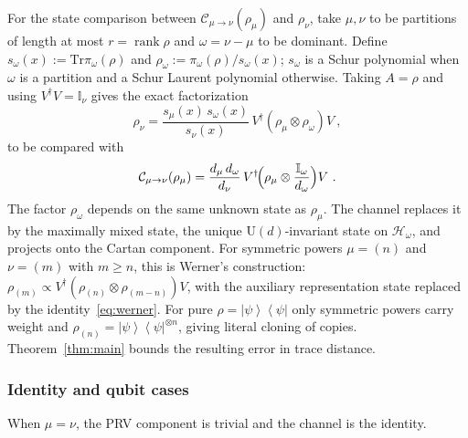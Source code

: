 \documentclass[a4paper,onecolumn,11pt]{quantumarticle}
\newcommand{\ketbra}[2]{\left|#1\right\rangle\!\!\left\langle #2\right|}
\def\h{\mathcal{H}}
\def\id{\mathbb{I}}
\newcommand*{\Tr}{\mathrm{Tr}}
\def\map{\mathcal}
\begin{document}
For the state comparison between $\map C_{\mu\to\nu}(\rho_\mu)$ and $\rho_\nu$, take $\mu,\nu$ to be partitions of length at
most $r=\operatorname{rank}\rho$ and $\omega=\nu-\mu$ to be dominant.
Define
$s_\omega(x):=\Tr\pi_\omega(\rho)$ and
$\rho_\omega:=\pi_\omega(\rho)/s_\omega(x)$; $s_\omega$ is a Schur
polynomial when $\omega$ is a partition and a Schur Laurent polynomial
otherwise.
Taking $A=\rho$ and using $V^\dagger V=\id_\nu$ gives the exact factorization
\begin{equation}\label{eq:cartan_factorization}
\rho_\nu=\frac{s_\mu(x)\,s_\omega(x)}{s_\nu(x)}\,V^\dagger(\rho_\mu\otimes\rho_\omega)V\ ,
\end{equation}
to be compared with
\begin{equation}\label{eq:cloner_substitution}
\mathcal C_{\mu\to\nu}(\rho_\mu)=\frac{d_\mu\,d_\omega}{d_\nu}\,V^\dagger\!\Bigl(\rho_\mu\otimes\frac{\id_\omega}{d_\omega}\Bigr)V\ .
\end{equation}
The factor $\rho_\omega$ depends on the same unknown state as
$\rho_\mu$. The channel replaces it by the maximally mixed state,
the unique $\mathrm U(d)$-invariant state on $\h_\omega$, and projects
onto the Cartan component. For symmetric powers $\mu=(n)$ and
$\nu=(m)$ with $m\ge n$, this is Werner's construction:
$\rho_{(m)}\propto V^\dagger(\rho_{(n)}\otimes\rho_{(m-n)})V$,
with the auxiliary representation state replaced by the identity~\eqref{eq:werner}. For pure $\rho=\ketbra{\psi}{\psi}$ only symmetric powers carry weight
and $\rho_{(n)}=\ketbra{\psi}{\psi}^{\otimes n}$, giving literal cloning
of copies. 
Theorem~\ref{thm:main} bounds the resulting error in trace distance.


\subsubsection{Identity and qubit cases}
When $\mu=\nu$, the PRV component is trivial and the channel is the identity.
\end{document}
